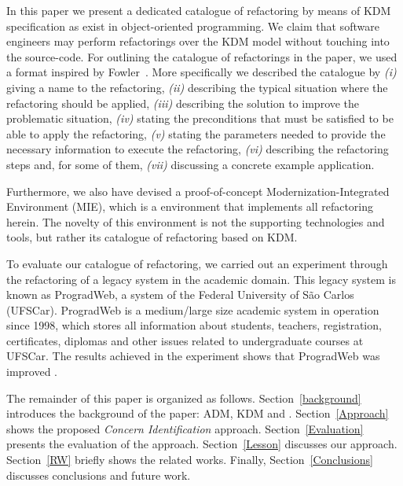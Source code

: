 In this paper we present a dedicated catalogue of refactoring by means of KDM specification as exist in object-oriented programming. We claim that software engineers may perform refactorings over the KDM model without touching into the source-code. %
For outlining the catalogue of refactorings in the paper, we used a format inspired by Fowler~\cite{refactImpro}. More specifically we described the catalogue by \textit{(i)} giving a name to the refactoring, \textit{(ii)} describing the typical situation where the refactoring should be applied, \textit{(iii)} describing the solution to improve the problematic situation, \textit{(iv)} stating the preconditions that must be satisfied to be able to apply the refactoring, \textit{(v)} stating the parameters needed to provide the necessary information to execute the refactoring, \textit{(vi)} describing the refactoring steps and, for some of them, \textit{(vii)} discussing a concrete example application. 

Furthermore, we also have devised a proof-of-concept Modernization-Integrated Environment (MIE), which is a environment that implements all refactoring herein.  The novelty of this environment is not the supporting technologies and tools, but rather its catalogue of refactoring based on KDM.

To evaluate our catalogue of refactoring, we carried out an experiment through the refactoring of a legacy system in the academic domain. This legacy system is known as ProgradWeb, a system of the Federal University of S\~{a}o Carlos (UFSCar). ProgradWeb is a medium/large size academic system in operation since 1998, which stores all information about students, teachers, registration, certificates, diplomas and other issues related to undergraduate courses at UFSCar. The results achieved in the experiment shows that ProgradWeb was improved .

The remainder of this paper is organized as follows. Section~\ref{background} introduces the background of the paper: ADM, KDM and  . Section~\ref{Approach} shows the proposed \textit{Concern Identification} approach. Section~\ref{Evaluation} presents the evaluation of the approach. Section~\ref{Lesson} discusses our approach. Section~\ref{RW} briefly shows the related works. Finally, Section~\ref{Conclusions} discusses conclusions and future work.